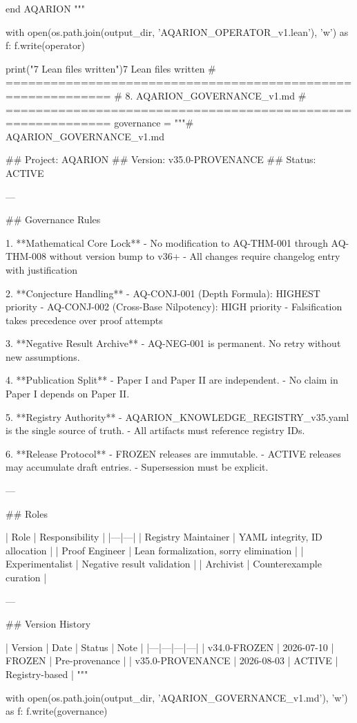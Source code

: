 end AQARION
"""

with open(os.path.join(output_dir, 'AQARION_OPERATOR_v1.lean'), 'w') as f:
    f.write(operator)

print("7 Lean files written")7 Lean files written
# ============================================================
# 8. AQARION_GOVERNANCE_v1.md
# ============================================================
governance = """# AQARION_GOVERNANCE_v1.md

## Project: AQARION
## Version: v35.0-PROVENANCE
## Status: ACTIVE

---

## Governance Rules

1. **Mathematical Core Lock**
   - No modification to AQ-THM-001 through AQ-THM-008 without version bump to v36+
   - All changes require changelog entry with justification

2. **Conjecture Handling**
   - AQ-CONJ-001 (Depth Formula): HIGHEST priority
   - AQ-CONJ-002 (Cross-Base Nilpotency): HIGH priority
   - Falsification takes precedence over proof attempts

3. **Negative Result Archive**
   - AQ-NEG-001 is permanent. No retry without new assumptions.

4. **Publication Split**
   - Paper I and Paper II are independent.
   - No claim in Paper I depends on Paper II.

5. **Registry Authority**
   - AQARION_KNOWLEDGE_REGISTRY_v35.yaml is the single source of truth.
   - All artifacts must reference registry IDs.

6. **Release Protocol**
   - FROZEN releases are immutable.
   - ACTIVE releases may accumulate draft entries.
   - Supersession must be explicit.

---

## Roles

| Role | Responsibility |
|---|---|
| Registry Maintainer | YAML integrity, ID allocation |
| Proof Engineer | Lean formalization, sorry elimination |
| Experimentalist | Negative result validation |
| Archivist | Counterexample curation |

---

## Version History

| Version | Date | Status | Note |
|---|---|---|---|
| v34.0-FROZEN | 2026-07-10 | FROZEN | Pre-provenance |
| v35.0-PROVENANCE | 2026-08-03 | ACTIVE | Registry-based |
"""

with open(os.path.join(output_dir, 'AQARION_GOVERNANCE_v1.md'), 'w') as f:
    f.write(governance)

